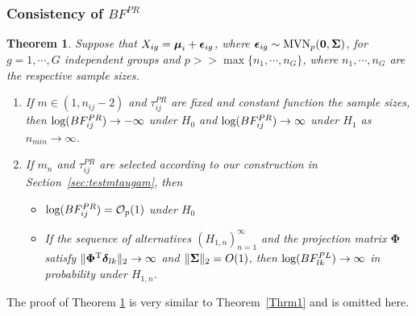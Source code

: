 \documentclass[times,sort&compress,3p]{elsarticle}
\theoremstyle{plain}%
\newtheorem{theorem}{Theorem}
\theoremstyle{definition}
\def\bzero{{\mathbf 0}}
\def\log{\hbox{log}}
\def\MVN{\hbox{MVN}}
\def\log{\hbox{log}}
\def\trans{^{\rm T}}
\def\bzero{{\mathbf 0}}
\newcommand{\bSigma}{\mbox{\boldmath $\Sigma$}}
\newcommand{\udelta}            {\mbox{\boldmath$\delta$}}
\newcommand{\uepsilon}          {\mbox{\boldmath$\epsilon$}}
\newcommand{\umu}               {\mbox{\boldmath$\mu$}}
\newcommand{\uSigma}            {\mbox{\boldmath$\Sigma$}}
\begin{document}
\subsubsection{Consistency of $BF_{}^{PR}$}
\begin{theorem}\label{Thrm2}
Suppose that $X_{ig} = \umu_i + \uepsilon_{ig}$, where $\uepsilon_{ig} \sim \MVN_{p}(\bzero, \uSigma)$, for $g = 1, \cdots, G$ independent groups and $p >> \max\{n_1, \cdots, n_{G}\}$, where $n_1, \cdots, n_{G}$ are the respective sample sizes. %
\begin{enumerate}
    \item If $m \in (1,  n_{ij} - 2)$ and $\tau^{PR}_{ij}$ are fixed and constant function the sample sizes, 
    then $\log(BF^{PR}_{ij}) \rightarrow -\infty$ under $H_0$ and $\log(BF^{PR}_{ij}) \rightarrow \infty$ under $H_1$ as $n_{min} \rightarrow \infty$. 
    \item If $m_n$ and $\tau^{PR}_{ij}$ are selected according to our construction in Section~\ref{sec:testmtaugam}, then 
    \begin{itemize}
     \item[(a)]  $\log(BF^{PR}_{ij}) = \mathcal{O}_{p}(1)$ under $H_0$ 
     \item[(b)] 
     If the sequence of alternatives $(H_{1,n})_{n = 1}^\infty$ and the projection matrix $\mathbf{\Phi}$ satisfy $\|\mathbf{\Phi}\trans\udelta_{lk}\|_2\to\infty$ and $\|\bSigma\|_2 = O(1)$, then $\log(BF^{PL}_{lk}) \rightarrow \infty$ in probability under $H_{1,n}$. 
    \end{itemize}
\end{enumerate}
\end{theorem}
The proof of Theorem \ref{Thrm2} is very similar to Theorem~\ref{Thrm1} and is omitted here. 
\end{document}
